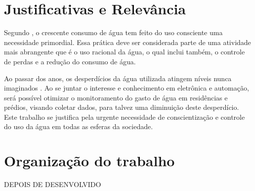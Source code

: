 \section{Justificativas e Relev{\^a}ncia}
%
Segundo \cite{AlvesDaSilva}, o crescente consumo de água
tem feito do uso consciente uma necessidade primordial. Essa prática deve ser considerada parte de uma atividade mais abrangente que é o uso racional da água, o qual inclui também, o controle de perdas e a redução do consumo de água.

Ao passar dos anos, os desperdícios da água utilizada atingem níveis nunca imaginados \cite{rebouccas2003agua}. Ao se juntar o interesse e conhecimento em eletrônica e automação, será possível otimizar o monitoramento do gasto de água em residências e prédios, visando coletar dados, para talvez uma diminuição deste desperdício. Este trabalho se justifica pela urgente necessidade de conscientização e controle do uso da água em todas as esferas da sociedade. 
%
\section{Organização do trabalho}

DEPOIS DE DESENVOLVIDO